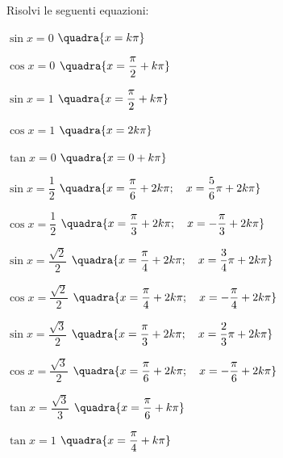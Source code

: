 \begin{esercizio}\label{ese:03.1}
Risolvi le seguenti equazioni:
 \begin{enumeratea}
  \item $\sin x = 0$
   \hfill $\quadra{x = k \pi}$
  \item $\cos x = 0$
   \hfill $\quadra{x = \dfrac{\pi}{2} + k \pi}$
  \item $\sin x = 1$
   \hfill $\quadra{x = \dfrac{\pi}{2} + k \pi}$
  \item $\cos x = 1$
   \hfill $\quadra{x = 2 k \pi}$
  \item $\tan x = 0$
   \hfill $\quadra{x = 0 + k \pi}$
  \item $\sin x = \dfrac{1}{2}$
   \hfill $\quadra{x = \dfrac{\pi}{6} + 2k \pi; \quad
                   x = \dfrac{5}{6}\pi + 2k \pi}$
  \item $\cos x = \dfrac{1}{2}$
   \hfill $\quadra{x = \dfrac{\pi}{3} + 2k \pi; \quad
                   x = -\dfrac{\pi}{3} + 2k \pi}$
  \item $\sin x = \dfrac{\sqrt{2}}{2}$
   \hfill $\quadra{x = \dfrac{\pi}{4} + 2k \pi; \quad
                   x = \dfrac{3}{4}\pi + 2k \pi}$
  \item $\cos x = \dfrac{\sqrt{2}}{2}$
   \hfill $\quadra{x = \dfrac{\pi}{4} + 2k \pi; \quad
                   x = -\dfrac{\pi}{4} + 2k \pi}$
  \item $\sin x = \dfrac{\sqrt{3}}{2}$
   \hfill $\quadra{x = \dfrac{\pi}{3} + 2k \pi; \quad
                   x = \dfrac{2}{3}\pi + 2k \pi}$
  \item $\cos x = \dfrac{\sqrt{3}}{2}$
   \hfill $\quadra{x = \dfrac{\pi}{6} + 2k \pi; \quad
                   x = -\dfrac{\pi}{6} + 2k \pi}$
  \item $\tan x = \dfrac{\sqrt{3}}{3}$
   \hfill $\quadra{x = \dfrac{\pi}{6} + k \pi}$
  \item $\tan x = 1$
   \hfill $\quadra{x = \dfrac{\pi}{4} + k \pi}$
 \end{enumeratea}
\end{esercizio}

